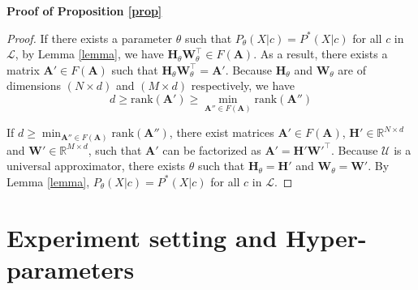 \textbf{Proof of Proposition \ref{prop}}

\begin{proof}
If there exists a parameter $\theta$ such that $P_\theta(X | c) = P^*(X | c)$ for all $c$ in $\mathcal{L}$, by Lemma \ref{lemma}, we have $\mathbf{H}_\theta \mathbf{W}_\theta^\top \in F(\mathbf{A})$. As a result, there exists a matrix $\mathbf{A}' \in F(\mathbf{A})$ such that $\mathbf{H}_\theta \mathbf{W}_\theta^\top = \mathbf{A}'$. Because $\mathbf{H}_\theta$ and $\mathbf{W}_\theta$ are of dimensions $(N \times d)$ and $(M \times d)$ respectively, we have
\[
d \geq \text{rank}(\mathbf{A}') \geq \min_{\mathbf{A''} \in F(\mathbf{A})} \text{rank}(\mathbf{A}'')
\]


If $d \geq \min_{\mathbf{A''} \in F(\mathbf{A})} \text{rank}(\mathbf{A}'')$, there exist matrices $\mathbf{A}' \in F(\mathbf{A})$, $\mathbf{H}' \in \mathbb{R}^{N \times d}$ and $\mathbf{W}' \in \mathbb{R}^{M \times d}$, such that $\mathbf{A}'$ can be factorized as $\mathbf{A}' = \mathbf{H}' \mathbf{W}'^\top$. Because $\mathcal{U}$ is a universal approximator, there exists $\theta$ such that $\mathbf{H}_\theta = \mathbf{H}'$ and $\mathbf{W}_\theta = \mathbf{W}'$. By Lemma \ref{lemma}, $P_\theta(X | c) = P^*(X | c)$ for all $c$ in $\mathcal{L}$.
\end{proof}

\section{Experiment setting and Hyper-parameters}
